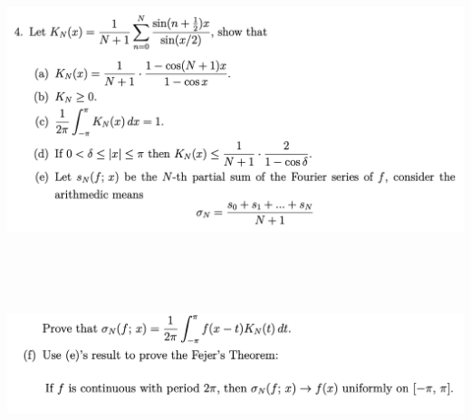 \documentclass{report}
\begin{document}
\begin{question}{}{}
\includegraphics[height=10cm,width=18cm]{ahw28}
\includegraphics[height=4cm,width=18cm]{ahw27}
\end{question}
\end{document}
